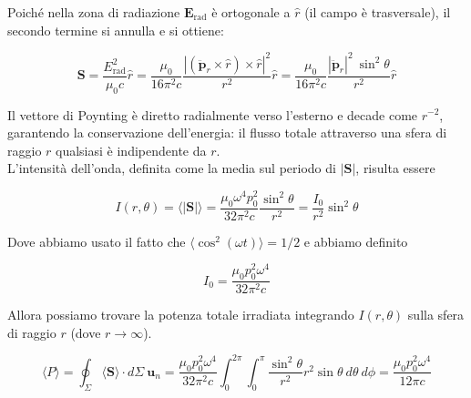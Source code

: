 Poiché nella zona di radiazione $\mathbf{E}_{\text{rad}} $ è ortogonale a $\hat{r}$ (il campo è trasversale), il secondo termine si annulla e si ottiene:

\begin{tcolorbox}[colback=yellow!10!white, colframe=orange!70!black,boxrule=0.8pt]
\begin{equation} \label{eq: Poynting_radiazione}
    \mathbf{S} = \frac{E_{\text{rad}}^2}{\mu_0 c} \hat{r} = \frac{\mu_0}{16\pi^2 c} \frac{|(\ddot{\mathbf{p}}_r \times \hat{r}) \times \hat{r}|^2}{r^2} \hat{r} = \frac{\mu_0}{16\pi^2 c}\frac{|\ddot{\mathbf{p}}_r |^2 \ \sin^2 \theta}{r^2} \hat{r}
\end{equation}
\end{tcolorbox}

Il vettore di Poynting è diretto radialmente verso l'esterno e decade come $r^{-2}$, garantendo la conservazione dell'energia: il flusso totale attraverso una sfera di raggio $r$ qualsiasi è indipendente da $r$.\\

L'intensità dell'onda, definita come la media sul periodo di $|\mathbf{S}|$, risulta essere 

\begin{tcolorbox}[colback=yellow!10!white, colframe=orange!70!black, boxrule=0.8pt]
\begin{equation}
    I(r,\theta) = \langle |\mathbf{S}| \rangle = \frac{\mu_0 \omega^4 p_0^2 }{32 \pi^2 c} \frac{\sin^2 \theta}{r^2} = \frac{I_0}{r^2} \sin^2 \theta
\end{equation}
\end{tcolorbox}

Dove abbiamo usato il fatto che $\langle \cos^2(\omega t) \rangle = 1/2$ e abbiamo definito 

\begin{tcolorbox}[colback=yellow!10!white, colframe=orange!70!black, boxrule=0.8pt]
\begin{equation}
    I_0 = \frac{\mu_0 p_0^2 \omega^4}{32 \pi^2 c}
\end{equation}
\end{tcolorbox}

Allora possiamo trovare la potenza totale irradiata integrando $I(r, \theta)$ sulla sfera di raggio $r$ (dove $r \to \infty$). 

\begin{equation}
    \langle P \rangle = \oint_{\Sigma} \langle \mathbf{S} \rangle \cdot d\Sigma \ \mathbf{u}_n = \frac{\mu_0 p_0^2 \omega^4}{32 \pi^2 c} \int_{0}^{2\pi} \int_{0}^{\pi} \frac{\sin^2 \theta}{r^2} r^2 \sin \theta \ d\theta \ d \phi = \frac{\mu_0 p_0^2 \omega^4}{12 \pi c}
\end{equation}

